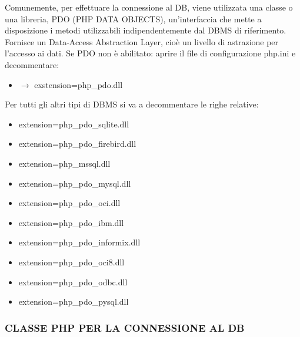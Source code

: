 Comunemente, per effettuare la connessione al DB, viene utilizzata una classe o una libreria, PDO (PHP DATA OBJECTS), un’interfaccia che mette a disposizione i metodi utilizzabili indipendentemente dal DBMS di riferimento. Fornisce un Data-Access Abstraction Layer, cioè un livello di astrazione per l’accesso ai dati.  
Se PDO non è abilitato: aprire il file di configurazione php.ini e decommentare:

\begin{itemize}
\item $\rightarrow$ exstension=php\_pdo.dll
\end{itemize}

Per tutti gli altri tipi di DBMS si va a decommentare le righe relative: 

\begin{itemize}
\item extension=php\_pdo\_sqlite.dll
\item extension=php\_pdo\_firebird.dll
\item extension=php\_mssql.dll
\item extension=php\_pdo\_mysql.dll
\item extension=php\_pdo\_oci.dll
\item extension=php\_pdo\_ibm.dll
\item extension=php\_pdo\_informix.dll
\item extension=php\_pdo\_oci8.dll
\item extension=php\_pdo\_odbc.dll
\item extension=php\_pdo\_pysql.dll 
\end{itemize}


\subsubsection{CLASSE PHP PER LA CONNESSIONE AL DB}


